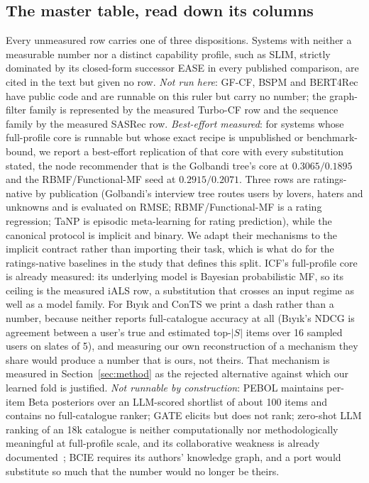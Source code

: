 \documentclass[acmsmall,review,anonymous]{acmart}
\begin{document}
\subsection{The master table, read down its columns}
Every unmeasured row carries one of three dispositions. Systems with neither a measurable number nor a distinct capability profile, such as SLIM, strictly dominated by its closed-form successor EASE in every published comparison, are cited in the text but given no row. \emph{Not run here}: GF-CF, BSPM and BERT4Rec have public code and are runnable on this ruler but carry no number; the graph-filter family is represented by the measured Turbo-CF row and the sequence family by the measured SASRec row. \emph{Best-effort measured}: for systems whose full-profile core is runnable but whose exact recipe is unpublished or benchmark-bound, we report a best-effort replication of that core with every substitution stated, the node recommender that is the Golbandi tree's core at $0.3065/0.1895$ and the RBMF/Functional-MF seed at $0.2915/0.2071$. Three rows are ratings-native by publication (Golbandi's interview tree routes users by lovers, haters and unknowns and is evaluated on RMSE; RBMF/Functional-MF is a rating regression; TaNP is episodic meta-learning for rating prediction), while the canonical protocol is implicit and binary. We adapt their mechanisms to the implicit contract rather than importing their task, which is what \citet{liang2018variational} do for the ratings-native baselines in the study that defines this split. ICF's full-profile core is already measured: its underlying model is Bayesian probabilistic MF, so its ceiling is the measured iALS row, a substitution that crosses an input regime as well as a model family. For B\i y\i k and ConTS we print a dash rather than a number, because neither reports full-catalogue accuracy at all (B\i y\i k's NDCG is agreement between a user's true and estimated top-$|S|$ items over 16 sampled users on slates of 5), and measuring our own reconstruction of a mechanism they share would produce a number that is ours, not theirs. That mechanism is measured in Section~\ref{sec:method} as the rejected alternative against which our learned fold is justified. \emph{Not runnable by construction}: PEBOL maintains per-item Beta posteriors over an LLM-scored shortlist of about 100 items and contains no full-catalogue ranker; GATE elicits but does not rank; zero-shot LLM ranking of an 18k catalogue is neither computationally nor methodologically meaningful at full-profile scale, and its collaborative weakness is already documented~\citep{he2023large}; BCIE requires its authors' knowledge graph, and a port would substitute so much that the number would no longer be theirs.
\end{document}
